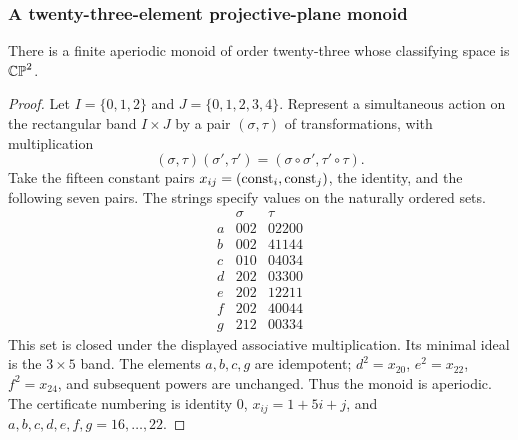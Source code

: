 \subsubsection{A twenty-three-element projective-plane monoid}

\begin{theorem}\label{B:CP23}
There is a finite aperiodic monoid of order twenty-three whose
classifying space is $\mathbb {CP}^2$.
\end{theorem}
\begin{proof}
Let $I=\{0,1,2\}$ and $J=\{0,1,2,3,4\}$.
Represent a simultaneous action on the rectangular band $I\times J$
by a pair $(\sigma,\tau)$ of transformations, with multiplication
\[
 (\sigma,\tau)(\sigma',\tau')
       =(\sigma\circ\sigma',\tau'\circ\tau).
\]
Take the fifteen constant pairs $x_{ij}=({\rm const}_i,
{\rm const}_j)$, the identity, and the following seven pairs.
The strings specify values on the naturally ordered sets.
\[
\begin{array}{c|cc}
 &\sigma&\tau\\\hline
a&002&02200\\ b&002&41144\\ c&010&04034\\
d&202&03300\\ e&202&12211\\ f&202&40044\\ g&212&00334
\end{array}
\]
This set is closed under the displayed associative multiplication.
Its minimal ideal is the $3\times5$ band.
The elements $a,b,c,g$ are idempotent; $d^2=x_{20}$,
$e^2=x_{22}$, $f^2=x_{24}$, and subsequent powers are unchanged.
Thus the monoid is aperiodic.  The certificate numbering is identity
$0$, $x_{ij}=1+5i+j$, and $a,b,c,d,e,f,g=16,\ldots,22$.


\end{proof}
